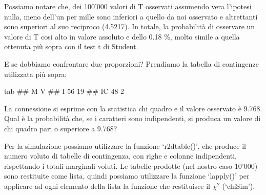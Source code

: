 \documentclass[a4paper,12pt,oneside]{book}
\newenvironment{Shaded}{}{}
\newcommand{\KeywordTok}[1]{#1}
\newcommand{\DecValTok}[1]{#1}
\newcommand{\FloatTok}[1]{#1}
\newcommand{\StringTok}[1]{#1}
\newcommand{\CommentTok}[1]{#1}
\newcommand{\ControlFlowTok}[1]{#1}
\newcommand{\OperatorTok}[1]{#1}
\newcommand{\NormalTok}[1]{#1}
\begin{document}
Possiamo notare che, dei 100'000 valori di T osservati assumendo vera l'ipotesi nulla, meno dell'un per mille sono inferiori a quello da noi osservato e altrettanti sono superiori al suo reciproco (4.5217). In totale, la probabilità di osservare un valore di T così alto in valore assoluto e dello 0.18 \%, molto simile a quella ottenuta più sopra con il test t di Student.

E se dobbiamo confrontare due proporzioni? Prendiamo la tabella di contingenze utilizzata più sopra:

\begin{Shaded}
\begin{Highlighting}[]
\NormalTok{tab}
\CommentTok{##     M  V}
\CommentTok{## I  56 19}
\CommentTok{## IC 48  2}
\end{Highlighting}
\end{Shaded}

La connessione si esprime con la statistica chi quadro e il valore osservato è 9.768. Qual è la probabilità che, se i caratteri sono indipendenti, si produca un valore di chi quadro pari o superiore a 9.768?

Per la simulazione possiamo utilizzare la funzione `r2dtable()', che produce il numero voluto di tabelle di contingenza, con righe e colonne indipendenti, rispettando i totali marginali voluti. Le tabelle prodotte (nel nostro caso 10'000) sono restituite come lista, quindi possiamo utilizzare la funzione `lapply()' per applicare ad ogni elemento della lista la funzione che restituisce il \(\chi^2\) (`chiSim').

\begin{Shaded}
\end{Shaded}
\end{document}
